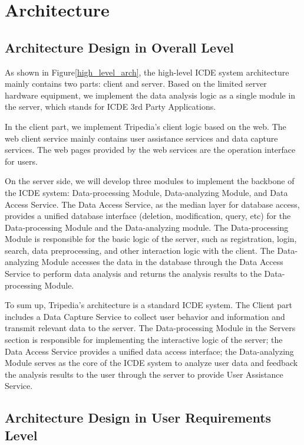 \documentclass[conference]{IEEEtran}
\begin{document}
\section{\textbf{Architecture}}


\subsection{\textbf{Architecture Design in Overall Level}}

As shown in Figure\ref{high_level_arch}, the high-level ICDE system architecture mainly contains two parts: client and server. Based on the limited server hardware equipment, we implement the data analysis logic as a single module in the server, which stands for ICDE 3rd Party Applications. 

In the client part, we implement Tripedia's client logic based on the web. The web client service mainly contains user assistance services and data capture services. The web pages provided by the web services are the operation interface for users.

On the server side, we will develop three modules to implement the backbone of the ICDE system: Data-processing Module, Data-analyzing Module, and Data Access Service. The Data Access Service, as the median layer for database access, provides a unified database interface (deletion, modification, query, etc) for the Data-processing Module and the Data-analyzing module. The Data-processing Module is responsible for the basic logic of the server, such as registration, login, search, data preprocessing, and other interaction logic with the client. The Data-analyzing Module accesses the data in the database through the Data Access Service to perform data analysis and returns the analysis results to the Data-processing Module.

To sum up, Tripedia's architecture is a standard ICDE system. The Client part includes a Data Capture Service to collect user behavior and information and transmit relevant data to the server. The Data-processing Module in the Servers section is responsible for implementing the interactive logic of the server; the Data Access Service provides a unified data access interface; the Data-analyzing Module serves as the core of the ICDE system to analyze user data and feedback the analysis results to the user through the server to provide User Assistance Service.


\subsection{\textbf{Architecture Design in User Requirements Level}}
\end{document}
